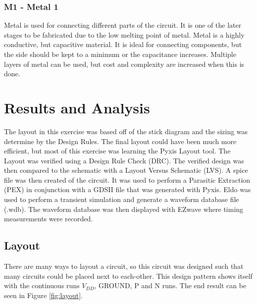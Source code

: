 \documentclass[11pt]{article}
\begin{document}
		\subsubsection{M1 - Metal 1}
		Metal is used for connecting different parts of the circuit. It is one of the later stages to be fabricated due to the low melting point of metal. Metal is a highly conductive, but capacitive material. It is ideal for connecting components, but the side should be kept to a minimum or the capacitance increases. Multiple layers of metal can be used, but cost and complexity are increased when this is done.
		

\section{Results and Analysis}

	The layout in this exercise was based off of the stick diagram and the sizing was determine by the Design Rules. The final layout could have been much more efficient, but most of this exercise was learning the Pyxis Layout tool. The Layout was verified using a Design Rule Check (DRC). The verified design was then compared to the schematic with a Layout Versus Schematic (LVS). A spice file was then created of the circuit. It was used to perform a Parasitic Extraction (PEX) in conjunction with a GDSII file that was generated with Pyxis. Eldo was used to perform a transient simulation and generate a waveform database file (.wdb). The waveform database was then displayed with EZwave where timing measurements were recorded.  

	\subsection{Layout}
	
		There are many ways to layout a circuit, so this circuit was designed such that many circuits could be placed next to each-other. This design pattern shows itself with the continuous runs $V_{DD}$, GROUND, P and N runs. The end result can be seen in Figure \ref{fig:layout}.
		
\end{document}

